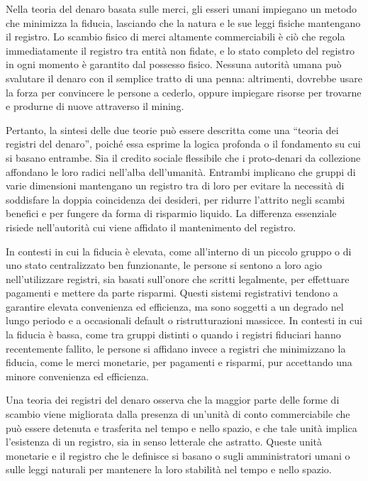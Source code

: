 \documentclass[
  a5paper,
  smalldemyvopaper,10pt,twoside,onecolumn,openright,extrafontsizes,hidelinks]{memoir}
\begin{document}
Nella teoria del denaro basata sulle merci, gli esseri umani impiegano
un metodo che minimizza la fiducia, lasciando che la natura e le sue
leggi fisiche mantengano il registro. Lo scambio fisico di merci
altamente commerciabili è ciò che regola immediatamente il registro tra
entità non fidate, e lo stato completo del registro in ogni momento è
garantito dal possesso fisico. Nessuna autorità umana può svalutare il
denaro con il semplice tratto di una penna: altrimenti, dovrebbe usare
la forza per convincere le persone a cederlo, oppure impiegare risorse
per trovarne e produrne di nuove attraverso il mining.

Pertanto, la sintesi delle due teorie può essere descritta come una
``teoria dei registri del denaro'', poiché essa esprime la logica
profonda o il fondamento su cui si basano entrambe. Sia il credito
sociale flessibile che i proto-denari da collezione affondano le loro
radici nell'alba dell'umanità. Entrambi implicano che gruppi di varie
dimensioni mantengano un registro tra di loro per evitare la necessità
di soddisfare la doppia coincidenza dei desideri, per ridurre l'attrito
negli scambi benefici e per fungere da forma di risparmio liquido. La
differenza essenziale risiede nell'autorità cui viene affidato il
mantenimento del registro.

In contesti in cui la fiducia è elevata, come all'interno di un piccolo
gruppo o di uno stato centralizzato ben funzionante, le persone si
sentono a loro agio nell'utilizzare registri, sia basati sull'onore che
scritti legalmente, per effettuare pagamenti e mettere da parte
risparmi. Questi sistemi registrativi tendono a garantire elevata
convenienza ed efficienza, ma sono soggetti a un degrado nel lungo
periodo e a occasionali default o ristrutturazioni massicce. In contesti
in cui la fiducia è bassa, come tra gruppi distinti o quando i registri
fiduciari hanno recentemente fallito, le persone si affidano invece a
registri che minimizzano la fiducia, come le merci monetarie, per
pagamenti e risparmi, pur accettando una minore convenienza ed
efficienza.

Una teoria dei registri del denaro osserva che la maggior parte delle
forme di scambio viene migliorata dalla presenza di un'unità di conto
commerciabile che può essere detenuta e trasferita nel tempo e nello
spazio, e che tale unità implica l'esistenza di un registro, sia in
senso letterale che astratto. Queste unità monetarie e il registro che
le definisce si basano o sugli amministratori umani o sulle leggi
naturali per mantenere la loro stabilità nel tempo e nello spazio.
\end{document}
